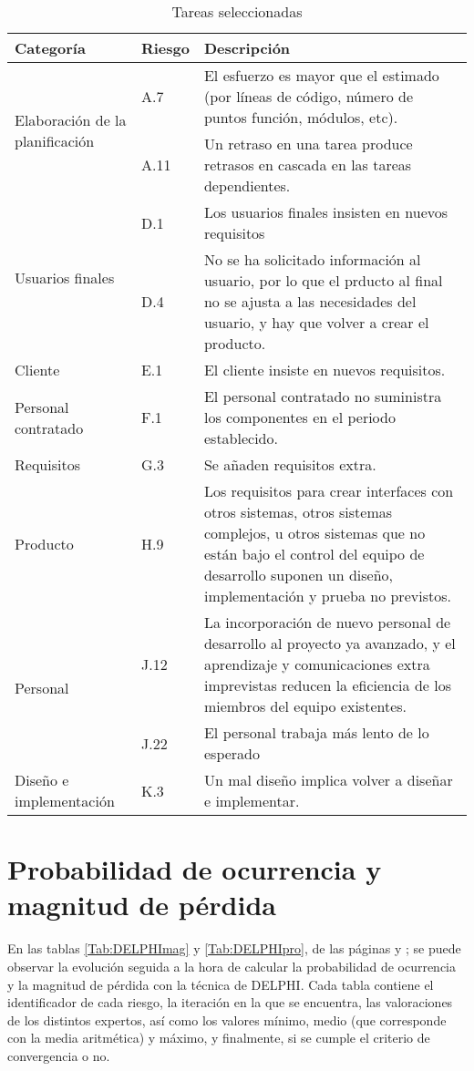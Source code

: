 \documentclass[11pt,a4paper,spanish,twoside]{book}
\begin{document}
\begin{table}[!ht]
  \centering
  \begin{tabular}{|p{3.5cm}||p{1.1cm}|p{6.3cm}|}
    \hline
    \textbf{Categoría} & \textbf{Riesgo} & \textbf{Descripción} \\
    \hline\hline
    \multirow{2}{3.5cm}{Elaboración de la planificación}
    & A.7 & El esfuerzo es mayor que el estimado (por líneas de código,
    número de puntos función, módulos, etc). \\  
    \cline{2-3}
    & A.11 & Un retraso en una tarea produce retrasos en cascada en las
    tareas dependientes. \\
    \hline
    \multirow{2}{3cm}{Usuarios finales}
    & D.1 & Los usuarios finales insisten en nuevos requisitos\\
    \cline{2-3}
    & D.4 & No se ha solicitado información al usuario, por lo que el prducto
    al final  no se ajusta a las necesidades del usuario, y hay que volver a
    crear el producto.\\
    \hline
    Cliente& E.1 & El cliente insiste en nuevos requisitos.\\
    \hline
    Personal contratado & F.1 & El personal contratado no suministra los
    componentes en el periodo establecido.\\
    \hline
    Requisitos& G.3 & Se añaden requisitos extra.\\
    \hline
    Producto & H.9 &  Los requisitos para crear interfaces con otros
    sistemas, otros sistemas complejos, u otros sistemas que no están bajo el
    control del equipo de desarrollo suponen un diseño, implementación y
    prueba no previstos.\\ 
    \hline
    \multirow{2}{3.5cm}{Personal}
    & J.12 & La incorporación de nuevo personal de desarrollo al proyecto ya
    avanzado, y el aprendizaje y comunicaciones extra imprevistas reducen la
    eficiencia de los miembros del equipo existentes.\\ 
    \cline{2-3}
    & J.22 & El personal trabaja más lento de lo esperado\\
    \hline
    \multirow{1}{3.5cm}{Diseño e implementación}
    & K.3 & Un mal diseño implica volver a diseñar e implementar.\\
   \hline
  \end{tabular}
  \caption{Tareas seleccionadas}
  \label{Tab:tar_sel}
\end{table}

\chapter{Probabilidad de ocurrencia y magnitud de pérdida} 
En las tablas \ref{Tab:DELPHImag} y \ref{Tab:DELPHIpro}, de las páginas
\pageref{Tab:DELPHImag} y \pageref{Tab:DELPHIpro}; se  
puede observar la evolución seguida a la hora de calcular la probabilidad de
ocurrencia y la magnitud de pérdida con la técnica de DELPHI. Cada tabla
contiene el identificador de cada riesgo, la iteración en 
la que se encuentra, las valoraciones de los distintos expertos, así como los
valores mínimo, medio (que
corresponde con la media aritmética) y máximo, y finalmente, si se cumple el
criterio de convergencia o no. 
\end{document}

